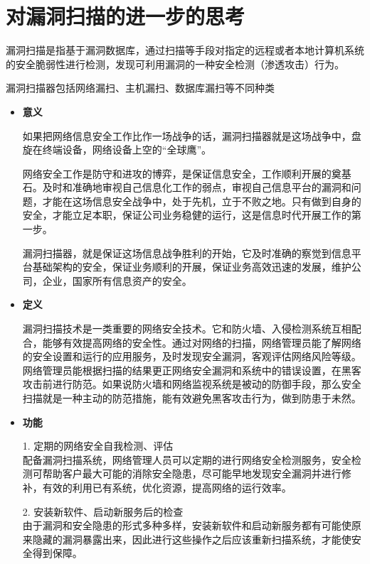 \documentclass{article}
\begin{document}
\section{对漏洞扫描的进一步的思考}
漏洞扫描是指基于漏洞数据库，通过扫描等手段对指定的远程或者本地计算机系统的安全脆弱性进行检测，发现可利用漏洞的一种安全检测（渗透攻击）行为。\par
漏洞扫描器包括网络漏扫、主机漏扫、数据库漏扫等不同种类\citep{doupe2012enemy}\par
\begin{itemize}
    \item {\bf 意义}\par
    如果把网络信息安全工作比作一场战争的话，漏洞扫描器就是这场战争中，盘旋在终端设备，网络设备上空的“全球鹰”。\par
    网络安全工作是防守和进攻的博弈，是保证信息安全，工作顺利开展的奠基石。及时和准确地审视自己信息化工作的弱点，审视自己信息平台的漏洞和问题，才能在这场信息安全战争中，处于先机，立于不败之地。只有做到自身的安全，才能立足本职，保证公司业务稳健的运行，这是信息时代开展工作的第一步。\par
    漏洞扫描器，就是保证这场信息战争胜利的开始，它及时准确的察觉到信息平台基础架构的安全，保证业务顺利的开展，保证业务高效迅速的发展，维护公司，企业，国家所有信息资产的安全。\par
    \item {\bf 定义}\par
    漏洞扫描技术是一类重要的网络安全技术。它和防火墙、入侵检测系统互相配合，能够有效提高网络的安全性。通过对网络的扫描，网络管理员能了解网络的安全设置和运行的应用服务，及时发现安全漏洞，客观评估网络风险等级。网络管理员能根据扫描的结果更正网络安全漏洞和系统中的错误设置，在黑客攻击前进行防范。如果说防火墙和网络监视系统是被动的防御手段，那么安全扫描就是一种主动的防范措施，能有效避免黑客攻击行为，做到防患于未然。\par
    \item {\bf 功能}\par
    1. 定期的网络安全自我检测、评估 \\
    配备漏洞扫描系统，网络管理人员可以定期的进行网络安全检测服务，安全检测可帮助客户最大可能的消除安全隐患，尽可能早地发现安全漏洞并进行修补，有效的利用已有系统，优化资源，提高网络的运行效率。\par
    2. 安装新软件、启动新服务后的检查\\
    由于漏洞和安全隐患的形式多种多样，安装新软件和启动新服务都有可能使原来隐藏的漏洞暴露出来，因此进行这些操作之后应该重新扫描系统，才能使安全得到保障。\par

\end{itemize}
\end{document}
